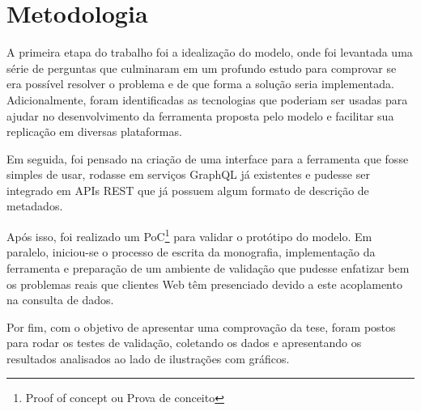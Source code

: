 \section[Metodologia]{Metodologia}

A primeira etapa do trabalho foi a idealização do modelo, onde foi levantada uma série de perguntas que culminaram em um profundo estudo para comprovar se era possível resolver o problema e de que forma a solução seria implementada. Adicionalmente, foram identificadas as tecnologias que poderiam ser usadas para ajudar no desenvolvimento da ferramenta proposta pelo modelo e facilitar sua replicação em diversas plataformas.

Em seguida, foi pensado na criação de uma interface para a ferramenta que fosse simples de usar, rodasse em serviços GraphQL já existentes e pudesse ser integrado em APIs REST que já possuem algum formato de descrição de metadados.

Após isso, foi realizado um PoC\footnote{
  Proof of concept ou Prova de conceito
} para validar o protótipo do modelo. Em paralelo, iniciou-se o processo de escrita da monografia, implementação da ferramenta e preparação de um ambiente de validação que pudesse enfatizar bem os problemas reais que clientes Web têm presenciado devido a este acoplamento na consulta de dados.

Por fim, com o objetivo de apresentar uma comprovação da tese, foram postos para rodar os testes de validação, coletando os dados e apresentando os resultados analisados ao lado de ilustrações com gráficos.
